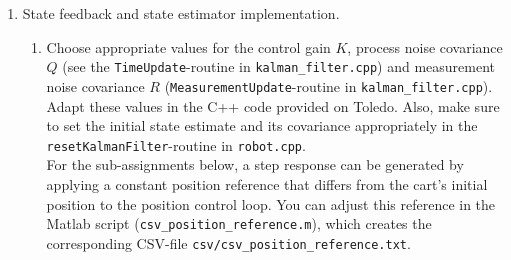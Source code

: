 \documentclass[10pt,a4paper]{article}
\begin{document}
\begin{enumerate}
  \item State feedback and state estimator implementation.
  \begin{enumerate}
    \item Choose appropriate values for the control gain $K$, process noise covariance $Q$ (see the \texttt{TimeUpdate}-routine in \texttt{kalman\_filter.cpp}) and measurement noise covariance $R$ (\texttt{MeasurementUpdate}-routine in \texttt{kalman\_filter.cpp}). Adapt these values in the C++ code provided on Toledo. Also, make sure to set the initial state estimate and its covariance appropriately in the \texttt{resetKalmanFilter}-routine in \texttt{robot.cpp}.\\
    For the sub-assignments below, a step response can be generated by applying a constant position reference that differs from the cart's initial position to the position control loop. You can adjust this reference in the Matlab script (\texttt{csv\_position\_reference.m}), which creates the corresponding CSV-file \verb"csv/csv_position_reference.txt".


\end{enumerate}
\end{enumerate}
\end{document}
